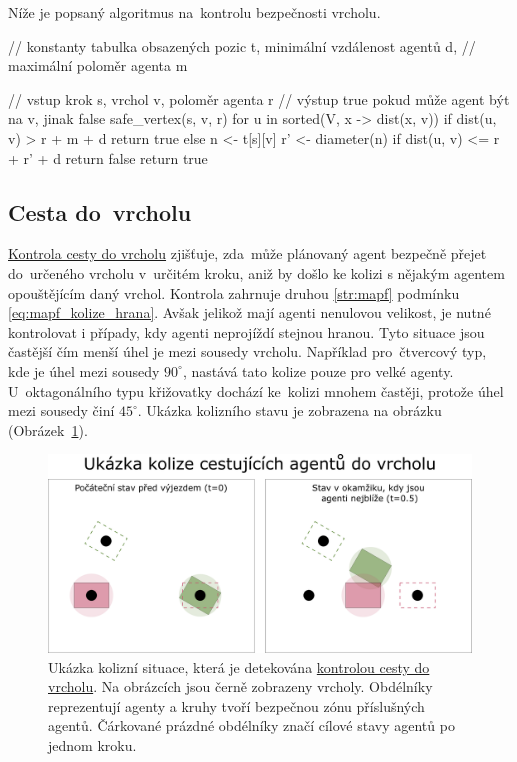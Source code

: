 Níže je popsaný algoritmus na~kontrolu bezpečnosti vrcholu.
\begin{code}
// konstanty tabulka obsazených pozic t, minimální vzdálenost agentů d,
// maximální poloměr agenta m

// vstup krok s, vrchol v, poloměr agenta r
// výstup true pokud může agent být na v, jinak false
safe_vertex(s, v, r)
  for u in sorted(V, x -> dist(x, v))
    if dist(u, v) > r + m + d return true
    else
      n <- t[s][v]
      r' <- diameter(n)
      if dist(u, v) <= r + r' + d return false
  return true
\end{code}

\subsection{Cesta do~vrcholu}\label{subsec:cesta_do_vrcholu}


\hyperref[subsec:cesta_do_vrcholu]{Kontrola cesty do vrcholu} zjišťuje,
zda~může plánovaný agent bezpečně přejet do~určeného vrcholu v~určitém kroku,
aniž by došlo ke kolizi s nějakým agentem opouštějícím daný vrchol.
Kontrola zahrnuje druhou \ref{str:mapf} podmínku
 \eqref{eq:mapf_kolize_hrana}.
Avšak jelikož mají agenti nenulovou velikost, je nutné kontrolovat i případy, kdy agenti neprojíždí stejnou hranou.
Tyto situace jsou častější čím menší úhel je mezi sousedy vrcholu.
Například pro~čtvercový typ, kde je úhel mezi sousedy $90^\circ$, nastává tato kolize pouze pro velké agenty.
U~oktagonálního typu křižovatky dochází ke~kolizi mnohem častěji, protože úhel mezi sousedy činí $45^\circ$.
Ukázka kolizního stavu je zobrazena na obrázku (Obrázek~\ref{fig:kolize_cesta_do}).

\begin{figure}[h]
  \centering
  \includegraphics[width=\textwidth]{../img/kolize_cesta_do}
  \caption{
    Ukázka kolizní situace, která je detekována \hyperref[subsec:cesta_do_vrcholu]{kontrolou cesty do vrcholu}.
    Na obrázcích jsou černě zobrazeny vrcholy.
    Obdélníky reprezentují agenty a kruhy tvoří bezpečnou zónu příslušných agentů.
    Čárkované prázdné obdélníky značí cílové stavy agentů po jednom kroku.
  }
  \label{fig:kolize_cesta_do}
\end{figure}


